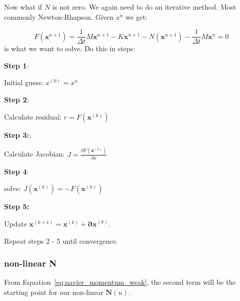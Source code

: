 \documentclass{article}
\begin{document}
Now what if $N$ is not zero. We again need to do an iterative method. Most commonly Newton-Rhapson. Given $x^n$ we get:

\begin{equation}
    F(\mathbf{x}^{n+1})=\frac{1}{\Delta t}M\mathbf{x}^{n+1} - K\mathbf{x}^{n+1}-N(\mathbf{x}^{n+1})-\frac{1}{\Delta t}M\mathbf{x}^n=0
\end{equation}
is what we want to solve. Do this in steps:
\vspace{.1in}

\textbf{Step 1}:

Initial guess: ${x^{(0)}=x^{n}}$

\vspace{.05in}

\textbf{Step 2}:

Calculate residual: $r = F(\mathbf{x}^{(k)})$

\vspace{.05in}

\textbf{Step 3:}:

Calculate Jacobian: $J = \frac {\partial F(\mathbf{x}^{(k)})}{\partial x}$

\vspace{.05in}

\textbf{Step 4}:

solve: $J(\mathbf{x}^{(k)}) = -F(\mathbf{x}^{(k)})$

\vspace{.05in}

\textbf{Step 5:}

Update $\mathbf{x}^{(k+1)}=\mathbf{x}^{(k)}+\mathbf{\partial x}^{(k)}$.

Repeat steps 2 - 5 until convergence.


\subsubsection*{non-linear N}

From Equation~\ref{eq:navier_momentum_weak}, the second term will be the starting point for our non-linear $\mathbf{N}(u)$.
\end{document}

